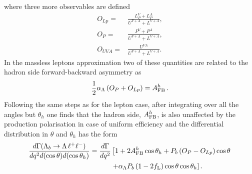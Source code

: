 where three more observables are defined
\begin{align}
O_{Lp}=&\frac{L_P^{V}+L_P^{A}}{U^{V+A}+L^{V+A}}, \nonumber \\
O_P=&\frac{P^{V}+P^{A}}{U^{V+A}+L^{V+A}}, \nonumber \\
O_{UVA}=&\frac{U^{VA}}{U^{V+A}+L^{V+A}}. \nonumber
\end{align}
%
In the massless leptons approximation two of these quantities are related to the hadron side
forward-backward asymmetry as
\begin{equation}
\frac{1}{2}\alpha_\Lambda \left(O_P+O_{Lp}\right)=A_{\rm FB}^h\,.
\end{equation}
%
Following the same steps as for the lepton case, after integrating over all the angles but $\theta_h$ one finds
that the hadron side, $A_{\rm FB}^h$, is also unaffected by the production polarisation in case of uniform
efficiency and the differential distribution in $\theta$ and $\theta_h$ has the form
\begin{align}
\frac{d\Gamma(\Lambda_{b}\rightarrow \Lambda \,\ell^{+}\ell^{-})}{dq^2d(\cos\theta) d(\cos\theta_h)}=
\frac{d\Gamma}{dq^2}&\left[1+2A_{\rm FB}^h\cos\theta_h+P_b\left(O_P-O_{Lp}\right)\cos\theta\right.\nonumber \\
&\left.+\alpha_\Lambda P_b\left(1-2f_{\rm L}\right)\cos\theta\cos\theta_h\right].
\label{eq:hadron2D}
\end{align}

